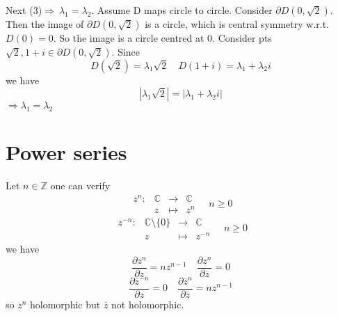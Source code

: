 \documentclass{book}
\newcommand{\abs}[1]{\left\lvert #1 \right\rvert}
\begin{document}
Next (3)$\Rightarrow\ \lambda_1=\lambda_2$. Assume D maps circle to circle. Consider $\partial D(0,\sqrt 2)$. Then the image of $\partial D(0,\sqrt 2)$ is a circle, which is central symmetry w.r.t. $D(0)=0$. So the image is a circle centred at 0. Consider pts $\sqrt 2,1+i\in \partial D(0,\sqrt 2)$. Since $$D(\sqrt 2)=\lambda_1\sqrt 2\quad D(1+i)=\lambda_1+\lambda_2i$$ we have $$\abs{\lambda_1\sqrt 2}=\abs{\lambda_1+\lambda_2i}$$
$\Rightarrow \lambda_1=\lambda_2$
\chapter{Power series}
Let $n\in \mathbb Z$ one can verify
$$\begin{aligned}
    z^n:&\mathbb C&\rightarrow&\mathbb C\\ &z&\mapsto&z^n
\end{aligned}\quad n\geq0$$
$$\begin{aligned}
    z^{-n}:&\mathbb C\setminus\{0\}&\rightarrow&\mathbb C\\ &z&\mapsto&z^{-n}
\end{aligned}\quad n\geq0$$
we have
$$\frac{\partial z^n}{\partial z}=nz^{n-1}\quad\frac{\partial z^n}{\partial\overline z}=0$$
$$\frac{\partial \overline z^{-n}}{\partial z}=0\quad\frac{\partial \overline z^n}{\partial\overline z}=nz^{n-1}$$
so $z^n$ holomorphic but $\overline z$ not holomorphic.
\end{document}
